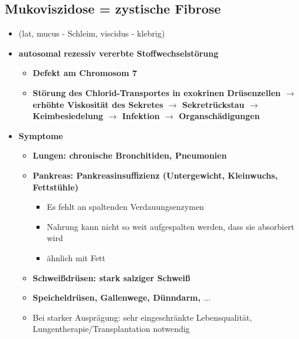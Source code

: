 \subsection{Mukoviszidose = zystische Fibrose}
	\begin{itemize}
		\item (lat, mucus - Schleim, viscidus - klebrig) 
		\item \textbf{autosomal rezessiv vererbte Stoffwechselstörung}
			\begin{itemize}
				\item \textbf{Defekt am Chromosom 7}
				\item \textbf{Störung des Chlorid-Transportes in exokrinen Drüsenzellen $\rightarrow$ erhöhte Viskosität des Sekretes $\rightarrow$ Sekretrückstau $\rightarrow$ Keimbesiedelung $\rightarrow$ Infektion $\rightarrow$ Organschädigungen}
			\end{itemize}
		\item \textbf{Symptome}
			\begin{itemize}
				\item \textbf{Lungen: chronische Bronchitiden, Pneumonien}
				\item \textbf{Pankreas: Pankreasinsuffizienz (Untergewicht, Kleinwuchs, Fettstühle)}
					\begin{itemize}
						\item Es fehlt an spaltenden Verdauungsenzymen
						\item Nahrung kann nicht so weit aufgespalten werden, dass sie absorbiert wird
						\item ähnlich mit Fett
					\end{itemize}
				\item \textbf{Schweißdrüsen: stark salziger Schweiß}
				\item \textbf{Speicheldrüsen, Gallenwege, Dünndarm, $\dots$}
				\item Bei starker Ausprägung: sehr eingeschränkte Lebensqualität, Lungentherapie/Transplantation notwendig
			\end{itemize}
	\end{itemize}
